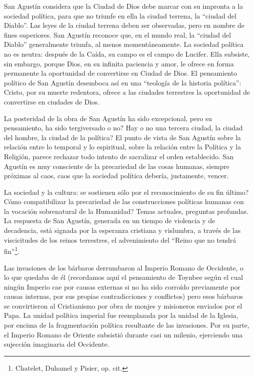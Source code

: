 \documentclass[
]{book}
\begin{document}
San Agustín considera que la Ciudad de Dios debe marcar con su impronta a la sociedad política, para que no triunfe en ella la ciudad terrena, la ``ciudad del Diablo''. Las leyes de la ciudad terrena deben ser observadas, pero en nombre de fines superiores. San Agustín reconoce que, en el mundo real, la ``ciudad del Diablo'' generalmente triunfa, al menos momentáneamente. La sociedad política no es neutra: después de la Caída, su campo es el campo de Lucifer. Ella subsiste, sin embargo, porque Dios, en su infinita paciencia y amor, le ofrece en forma permanente la oportunidad de convertirse en Ciudad de Dios. El pensamiento político de San Agustín desemboca así en una ``teología de la historia política'': Cristo, por su muerte redentora, ofrece a las ciudades terrestres la oportunidad de convertirse en ciudades de Dios.

La posteridad de la obra de San Agustín ha sido excepcional, pero su pensamiento, ha sido tergiversado o no? Hay o no una tercera ciudad, la ciudad del hombre, la ciudad de la política? El punto de vista de San Agustín sobre la relación entre lo temporal y lo espiritual, sobre la relación entre la Política y la Religión, parece rechazar todo intento de sacralizar el orden establecido. San Agustín es muy consciente de la precariedad de las cosas humanas, siempre próximas al caos, caos que la sociedad política debería, justamente, vencer.

La sociedad y la cultura: se sostienen sólo por el reconocimiento de su fin último? Cómo compatibilizar la precariedad de las construcciones políticas humanas con la vocación sobrenatural de la Humanidad? Temas actuales, preguntas profundas. La respuesta de San Agustín, generada en un tiempo de violencia y de decadencia, está signada por la esperanza cristiana y vislumbra, a través de las viscicitudes de los reinos terrestres, el advenimiento del ``Reino que no tendrá fin''\footnote{Chatelet, Duhamel y Pisier, op. cit.}.

Las invasiones de los bárbaros derrumbaron al Imperio Romano de Occidente, o lo que quedaba de él (recordamos aquí el pensamiento de Toynbee según el cual ningún Imperio cae por causas externas si no ha sido corroído previamente por causas internas, por sus propias contradicciones y conflictos) pero esos bárbaros se convirtieron al Cristianismo por obra de monjes y misioneros enviados por el Papa. La unidad política imperial fue reemplazada por la unidad de la Iglesia, por encima de la fragmentación política resultante de las invasiones. Por su parte, el Imperio Romano de Oriente subsistió durante casi un milenio, ejerciendo una sujección imaginaria del Occidente.
\end{document}
